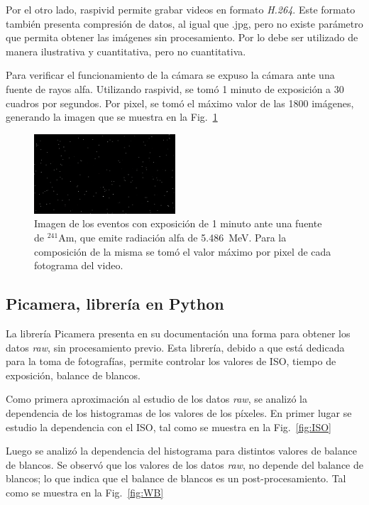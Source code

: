 \documentclass[twoside,twocolumn]{article}
\begin{document}
    Por el otro lado, raspivid permite grabar videos en formato \emph{H.264}.
    Este formato también presenta compresión de datos, al igual que .jpg, pero no existe parámetro que permita obtener las imágenes sin procesamiento.
    Por lo debe ser utilizado de manera ilustrativa y cuantitativa, pero no cuantitativa.

    Para verificar el funcionamiento de la cámara se expuso la cámara ante una fuente de rayos alfa.
    Utilizando raspivid, se tomó 1 minuto de exposición a 30 cuadros por segundos.
    Por pixel, se tomó el máximo valor de las 1800 imágenes, generando la imagen que se muestra en la Fig.~\ref{fig:raspivid}

    \begin{figure}[h]
      \includegraphics[width=0.47\textwidth]{figures/Alpha_1m.png} %
      \caption{Imagen de los eventos con exposición de 1 minuto ante una fuente de $^{241}$Am,
      que emite radiación alfa de \SI{5.486}{\mega\eV}.
      Para la composición de la misma se tomó el valor máximo por pixel de cada fotograma del video.
      } %
      \label{fig:raspivid}
    \end{figure}

  \subsection{Picamera, librería en Python} %
    La librería Picamera presenta en su documentación una forma para obtener los datos \emph{raw}, sin procesamiento previo.
    Esta librería, debido a que está dedicada para la toma de fotografías, permite controlar los valores de ISO, tiempo de exposición,
    balance de blancos.

    Como primera aproximación al estudio de los datos \emph{raw}, se analizó la dependencia de los histogramas de los valores de los píxeles.
    En primer lugar se estudio la dependencia con el ISO, tal como se muestra en la Fig.~\ref{fig:ISO}

    Luego se analizó la dependencia del histograma para distintos valores de balance de blancos.
    Se observó que los valores de los datos \emph{raw}, no depende del balance de blancos;
    lo que indica que el balance de blancos es un post-procesamiento.
    Tal como se muestra en la Fig.~\ref{fig:WB}
\end{document}
